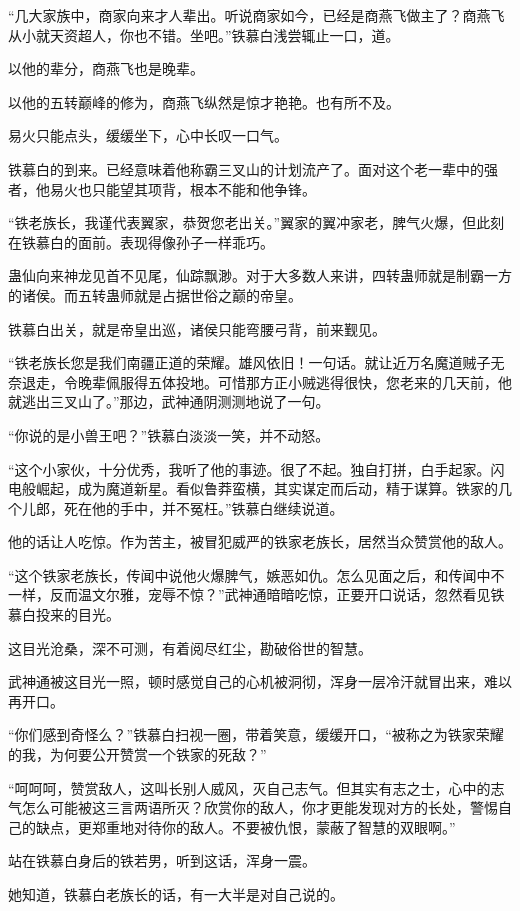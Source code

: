 \begin{this_body}
“几大家族中，商家向来才人辈出。听说商家如今，已经是商燕飞做主了？商燕飞从小就天资超人，你也不错。坐吧。”铁慕白浅尝辄止一口，道。

以他的辈分，商燕飞也是晚辈。

以他的五转巅峰的修为，商燕飞纵然是惊才艳艳。也有所不及。

易火只能点头，缓缓坐下，心中长叹一口气。

铁慕白的到来。已经意味着他称霸三叉山的计划流产了。面对这个老一辈中的强者，他易火也只能望其项背，根本不能和他争锋。

“铁老族长，我谨代表翼家，恭贺您老出关。”翼家的翼冲家老，脾气火爆，但此刻在铁慕白的面前。表现得像孙子一样乖巧。

蛊仙向来神龙见首不见尾，仙踪飘渺。对于大多数人来讲，四转蛊师就是制霸一方的诸侯。而五转蛊师就是占据世俗之巅的帝皇。

铁慕白出关，就是帝皇出巡，诸侯只能弯腰弓背，前来觐见。

“铁老族长您是我们南疆正道的荣耀。雄风依旧！一句话。就让近万名魔道贼子无奈退走，令晚辈佩服得五体投地。可惜那方正小贼逃得很快，您老来的几天前，他就逃出三叉山了。”那边，武神通阴测测地说了一句。

“你说的是小兽王吧？”铁慕白淡淡一笑，并不动怒。

“这个小家伙，十分优秀，我听了他的事迹。很了不起。独自打拼，白手起家。闪电般崛起，成为魔道新星。看似鲁莽蛮横，其实谋定而后动，精于谋算。铁家的几个儿郎，死在他的手中，并不冤枉。”铁慕白继续说道。

他的话让人吃惊。作为苦主，被冒犯威严的铁家老族长，居然当众赞赏他的敌人。

“这个铁家老族长，传闻中说他火爆脾气，嫉恶如仇。怎么见面之后，和传闻中不一样，反而温文尔雅，宠辱不惊？”武神通暗暗吃惊，正要开口说话，忽然看见铁慕白投来的目光。

这目光沧桑，深不可测，有着阅尽红尘，勘破俗世的智慧。

武神通被这目光一照，顿时感觉自己的心机被洞彻，浑身一层冷汗就冒出来，难以再开口。

“你们感到奇怪么？”铁慕白扫视一圈，带着笑意，缓缓开口，“被称之为铁家荣耀的我，为何要公开赞赏一个铁家的死敌？”

“呵呵呵，赞赏敌人，这叫长别人威风，灭自己志气。但其实有志之士，心中的志气怎么可能被这三言两语所灭？欣赏你的敌人，你才更能发现对方的长处，警惕自己的缺点，更郑重地对待你的敌人。不要被仇恨，蒙蔽了智慧的双眼啊。”

站在铁慕白身后的铁若男，听到这话，浑身一震。

她知道，铁慕白老族长的话，有一大半是对自己说的。


\end{this_body}
